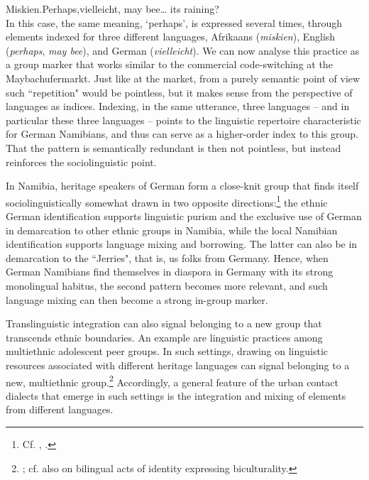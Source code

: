 \ea\label{ex:key:1}
{  Miskien.Perhaps,vielleicht, may bee… its raining?}\\
\z
In this case, the same meaning, ‘perhaps’, is expressed several times, through elements indexed for three different languages, Afrikaans (\textit{miskien}), English (\textit{perhaps}, \textit{may bee}), and German (\textit{vielleicht}). We can now analyse this practice as a group marker that works similar to the commercial code-switching at the Maybachufermarkt. Just like at the market, from a purely semantic point of view such “repetition" would be pointless, but it makes sense from the perspective of languages as indices. Indexing, in the same utterance, three languages – and in particular these three languages – points to the linguistic repertoire characteristic for German Namibians, and thus can serve as a higher-order index to this group. That the pattern is semantically redundant is then not pointless, but instead reinforces the sociolinguistic point.


In Namibia, heritage speakers of German form a close-knit group that finds itself sociolinguistically somewhat drawn in two opposite directions:\footnote{Cf. \citet{WieseBracke2021}, \citet{Leugner2022}.} the ethnic German identification supports linguistic purism and the exclusive use of German in demarcation to other ethnic groups in Namibia, while the local Namibian identification supports language mixing and borrowing. The latter can also be in demarcation to the “Jerries", that is, us folks from Germany. Hence, when German Namibians find themselves in diaspora in Germany with its strong monolingual habitus, the second pattern becomes more relevant, and such language mixing can then become a strong in-group marker.

Translinguistic integration can also signal belonging to a new group that transcends ethnic boundaries. An example are linguistic practices among multiethnic adolescent peer groups. In such settings, drawing on linguistic resources associated with different heritage languages can signal belonging to a new, multiethnic group.\footnote{\citealt{Wiese2022}; cf. also \textrm{\citet{Jungbluth2016} on bilingual acts of identity expressing biculturality.}} Accordingly, a general feature of the urban contact dialects that emerge in such settings is the integration and mixing of elements from different languages.

